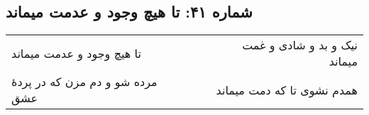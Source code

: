 \begin{center}
\section*{شماره ۴۱: تا هیچ وجود و عدمت میماند}
\label{sec:041}
\begin{longtable}{l p{0.5cm} r}
تا هیچ وجود و عدمت میماند
&&
نیک و بد و شادی و غمت میماند
\\
مرده شو و دم مزن که در پردهٔ عشق
&&
همدم نشوی تا که دمت میماند
\\
\end{longtable}
\end{center}
